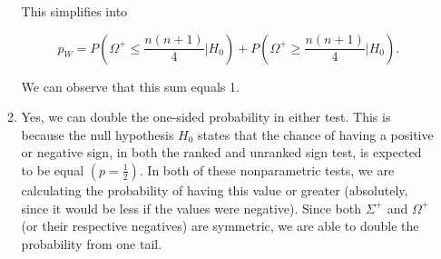\documentclass{article}
\begin{document}
\begin{enumerate}
\begin{enumerate}
			This simplifies into

			$$p_W = P(\Omega^+ \leq \frac{n(n+1)}{4} | H_0) + P(\Omega^+ \geq \frac{n(n+1)}{4} | H_0).$$

			We can observe that this sum equals 1.

			\item Yes, we can double the one-sided probability in either test. This is because the null hypothesis $H_0$ states that the chance of having a positive or negative sign, in both the ranked and unranked sign test, is expected to be equal $(p = \frac{1}{2})$. In both of these nonparametric tests, we are calculating the probability of having this value or greater (absolutely, since it would be less if the values were negative). Since both $\Sigma^+$ and $\Omega^+$ (or their respective negatives) are symmetric, we are able to double the probability from one tail. 
		\end{enumerate}
		
	\end{enumerate}
\end{document}
